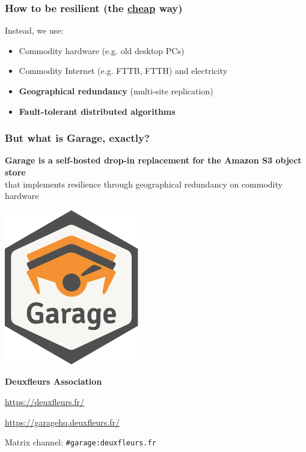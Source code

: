 \documentclass[aspectratio=169]{beamer}
\begin{document}
\begin{frame}
	\frametitle{How to be resilient (the \underline{\textbf{cheap}} way)}

	Instead, we use:
	\vspace{1em}
	\begin{itemize}
		\item Commodity hardware (e.g. old desktop PCs)
			\vspace{.5em}
		\item<2-> Commodity Internet (e.g. FTTB, FTTH) and electricity
			\vspace{.5em}
		\item<3-> \textbf{Geographical redundancy} (multi-site replication)
			\vspace{.5em}
		\item<4-> \textbf{Fault-tolerant distributed algorithms}
	\end{itemize}
	\vspace{1em}
\end{frame}

\begin{frame}
	\frametitle{But what is Garage, exactly?}
	\textbf{Garage is a self-hosted drop-in replacement for the Amazon S3 object store}\\
	\vspace{.5em}
	that implements resilience through geographical redundancy on commodity hardware

	\vspace{1em}

	\vspace{1em}

	\vspace{1em}
\end{frame}

\begin{frame}
	\centering
	\includegraphics[width=.3\linewidth]{../../sticker/Garage.pdf}
	\vspace{1em}

	{\large\bf Deuxfleurs Association}
	\vspace{1em}

	\url{https://deuxfleurs.fr/}

	\url{https://garagehq.deuxfleurs.fr/}

	Matrix channel: \texttt{\#garage:deuxfleurs.fr}
\end{frame}
\end{document}
